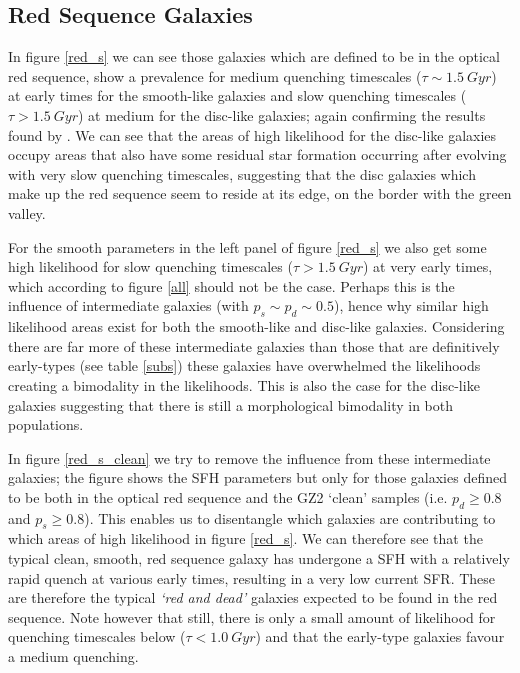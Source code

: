 \documentclass{mn2e}
\begin{document}
\subsection{Red Sequence Galaxies}



In figure \ref{red_s} we can see those galaxies which are defined to be in the optical red sequence, show a prevalence for medium quenching timescales ($\tau \sim1.5~Gyr$) at early times for the smooth-like galaxies and slow quenching timescales ($\tau > 1.5~Gyr$) at medium for the disc-like galaxies; again confirming the results found by \citet{Sch2014}. We can see that the areas of high likelihood for the disc-like galaxies occupy areas that also have some residual star formation occurring after evolving with very slow quenching timescales, suggesting that the disc galaxies which make up the red sequence seem to reside at its edge, on the border with the green valley. 

For the smooth parameters in the left panel of figure \ref{red_s} we also get some high likelihood for slow quenching timescales ($\tau > 1.5~Gyr$) at very early times, which according to figure \ref{all} should not be the case. Perhaps this is the influence of intermediate galaxies (with $p_s \sim p_d \sim 0.5$), hence why similar high likelihood areas exist for both the smooth-like and disc-like galaxies. Considering there are far more of these intermediate galaxies than those that are definitively early-types (see table \ref{subs}) these galaxies have overwhelmed the likelihoods creating a bimodality in the likelihoods. This is also the case for the disc-like galaxies suggesting that there is still a morphological bimodality in both populations.

In figure \ref{red_s_clean} we try to remove the influence from these intermediate galaxies; the figure shows the SFH parameters but only for those galaxies defined to be both in the optical red sequence and the GZ2 `clean' samples (i.e. $p_d \geq 0.8$ and $p_s \geq 0.8$). This enables us to disentangle which galaxies are contributing to which areas of high likelihood in figure \ref{red_s}. We can therefore see that the typical clean, smooth, red sequence galaxy has undergone a SFH with a relatively rapid quench at various early times, resulting in a very low current SFR. These are therefore the typical \emph{`red and dead'} galaxies expected to be found in the red sequence. Note however that still, there is only a small amount of likelihood for quenching timescales below ($\tau < 1.0~Gyr$) and that the early-type galaxies favour a medium quenching. 
\end{document}
